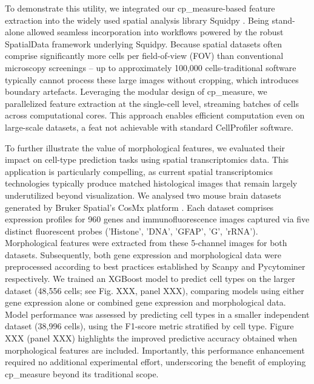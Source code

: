 \documentclass{article}
\begin{document}
To demonstrate this utility, we integrated our cp\_measure-based feature extraction into the widely used spatial analysis library Squidpy \citep{pallaSquidpyScalableFramework2022}. Being stand-alone allowed seamless incorporation into workflows powered by the robust SpatialData \citep{marconatoSpatialDataOpenUniversal2025} framework underlying Squidpy. Because spatial datasets often comprise significantly more cells per field-of-view (FOV) than conventional microscopy screenings -- up to approximately 100,000 cells-traditional software typically cannot process these large images without cropping, which introduces boundary artefacts. Leveraging the modular design of cp\_measure, we parallelized feature extraction at the single-cell level, streaming batches of cells across computational cores. This approach enables efficient computation even on large-scale datasets, a feat not achievable with standard CellProfiler software.

To further illustrate the value of morphological features, we evaluated their impact on cell-type prediction tasks using spatial transcriptomics data. This application is particularly compelling, as current spatial transcriptomics technologies typically produce matched histological images that remain largely underutilized beyond visualization. We analysed two mouse brain datasets generated by Bruker Spatial's CosMx platform \citep{CosMxSMIMouse2025}. Each dataset comprises expression profiles for 960 genes and immunofluorescence images captured via five distinct fluorescent probes ('Histone', 'DNA', 'GFAP', 'G', 'rRNA'). Morphological features were extracted from these 5-channel images for both datasets. Subsequently, both gene expression and morphological data were preprocessed according to best practices established by Scanpy \citep{wolfSCANPYLargescaleSinglecell2018} and Pycytominer \citep{serranoReproducibleImagebasedProfiling2025} respectively. We trained an XGBoost model to predict cell types on the larger dataset (48,556 cells; see Fig. XXX, panel XXX), comparing models using either gene expression alone or combined gene expression and morphological data. Model performance was assessed by predicting cell types in a smaller independent dataset (38,996 cells), using the F1-score metric stratified by cell type. Figure XXX (panel XXX) highlights the improved predictive accuracy obtained when morphological features are included. Importantly, this performance enhancement required no additional experimental effort, underscoring the benefit of employing cp\_measure beyond its traditional scope.
\end{document}
